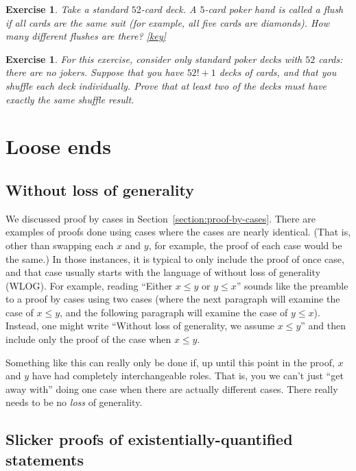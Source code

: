\documentclass{book}
\newcounter{ekcounter}%
\theoremstyle{ekimcustom}
\newtheorem{exercise}[ekcounter]{Exercise}
\begin{document}
\begin{exercise}
Take a standard $52$-card deck. A $5$-card poker hand is called a flush if all cards are the same suit (for example, all five cards are diamonds). How many different flushes are there? \quad\quad\href{https://www.sharelatex.com/read/qcmbqqqkfxfs}{{\color{red}[key]}}
\end{exercise}

\begin{exercise}
For this exercise, consider only standard poker decks with $52$ cards: there are no jokers. Suppose that you have $52!+1$ decks of cards, and that you shuffle each deck individually. Prove that at least two of the decks must have exactly the same shuffle result.
\end{exercise}

\chapter{Loose ends}

\section{Without loss of generality}

We discussed proof by cases in Section~\ref{section:proof-by-cases}. There are examples of proofs done using cases where the cases are nearly identical. (That is, other than swapping each $x$ and $y$, for example, the proof of each case would be the same.) In those instances, it is typical to only include the proof of once case, and that case usually starts with the language of without loss of generality (WLOG). For example, reading ``Either $x \leq y$ or $y \leq x$'' sounds like the preamble to a proof by cases using two cases (where the next paragraph will examine the case of $x \leq y$, and the following paragraph will examine the case of $y \leq x$). Instead, one might write ``Without loss of generality, we assume $x \leq y$'' and then include only the proof of the case when $x \leq y$.

Something like this can really only be done if, up until this point in the proof, $x$ and $y$ have had completely interchangeable roles. That is, you we can't just ``get away with'' doing one case when there are actually different cases. There really needs to be no \emph{loss} of generality.

\section{Slicker proofs of existentially-quantified statements}
\end{document}
